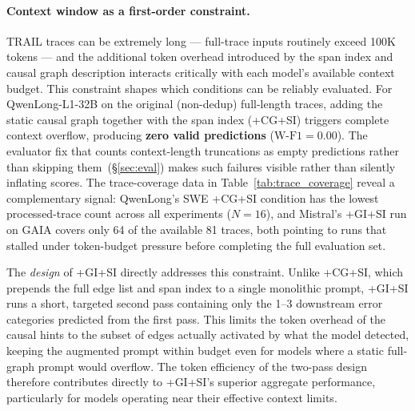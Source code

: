 \paragraph{Context window as a first-order constraint.}
TRAIL traces can be extremely long — full-trace inputs routinely exceed
100K tokens — and the additional token overhead introduced by the span index and
causal graph description interacts critically with each model's available context
budget.
This constraint shapes which conditions can be reliably evaluated.
For QwenLong-L1-32B on the original (non-dedup) full-length traces, adding the
static causal graph together with the span index (+CG+SI) triggers complete
context overflow, producing \textbf{zero valid predictions} ($\text{W-F1} = 0.00$).
The evaluator fix that counts context-length truncations as empty predictions
rather than skipping them~(§\ref{sec:eval}) makes such failures visible rather
than silently inflating scores.
The trace-coverage data in Table~\ref{tab:trace_coverage} reveal a complementary
signal: QwenLong's SWE +CG+SI condition has the lowest processed-trace count
across all experiments ($N{=}16$), and Mistral's +GI+SI run on GAIA covers only
64 of the available 81 traces, both pointing to runs that stalled under token-budget
pressure before completing the full evaluation set.

The \emph{design} of +GI+SI directly addresses this constraint.
Unlike +CG+SI, which prepends the full edge list and span index to a single
monolithic prompt, +GI+SI runs a short, targeted second pass containing only the
1–3 downstream error categories predicted from the first pass.
This limits the token overhead of the causal hints to the subset of edges actually
activated by what the model detected, keeping the augmented prompt within budget
even for models where a static full-graph prompt would overflow.
The token efficiency of the two-pass design therefore contributes directly to
+GI+SI's superior aggregate performance, particularly for models operating near
their effective context limits.


